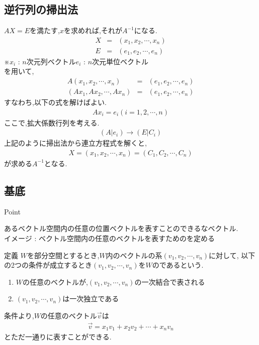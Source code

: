 \documentclass[a4paper]{jsarticle}
\begin{document}
\subsection{逆行列の掃出法}
$AX=E$\quad を満たす,$x$を求めれば,それが$A^{-1}$になる.
\begin{eqnarray*}
    X&=&\left(x_1,x_2,\cdots,x_n\right)\\
    E&=&\left(e_1,e_2,\cdots,e_n\right)
\end{eqnarray*}
※$x_i$ : $n$次元列ベクトル\quad $e_i$ : $n$次元単位ベクトル\\
を用いて,
\begin{eqnarray*}
    A\left(x_1,x_2,\cdots,x_n\right)&=&\left(e_1,e_2,\cdots,e_n\right)\\
    \left(Ax_1,Ax_2,\cdots,Ax_n\right)&=&\left(e_1,e_2,\cdots,e_n\right)
\end{eqnarray*}
すなわち,以下の式を解けばよい.
\begin{eqnarray*}
    Ax_i=e_i \left(i=1,2,\cdots,n\right)
\end{eqnarray*}
ここで,拡大係数行列を考える.
\begin{eqnarray*}
    \left(A|e_i\right) \rightarrow \left(E|C_i\right)
\end{eqnarray*}
上記のように掃出法から連立方程式を解くと,
\begin{eqnarray*}
    X=\left(x_1,x_2,\cdots,x_n\right)=\left(C_1,C_2,\cdots,C_n\right)
\end{eqnarray*}
が求める$A^{-1}$となる.
\subsection{基底}
\begin{itembox}[l]{Point}
    \begin{center}
        あるベクトル空間内の任意の位置ベクトルを表すことのできるなベクトル.\\
        イメージ : ベクトル空間内の任意のベクトルを表すためのを定める
    \end{center}
\end{itembox}
\begin{itembox}[l]{定義}
    $W$を部分空間とするとき,$W$内のベクトルの系$\left(v_1,v_2,\cdots,v_n\right)$に対して,
    以下の2つの条件が成立するとき$\left(v_1,v_2,\cdots,v_n\right)$を$W$のであるという.
    \begin{enumerate}[(1)]
        \item $W$の任意のベクトルが,$\left(v_1,v_2,\cdots,v_n\right)$の一次結合で表される
        \item $\left(v_1,v_2,\cdots,v_n\right)$は一次独立である
    \end{enumerate}
\end{itembox}
条件より,$W$の任意のベクトル$\vec{v}$は
\begin{eqnarray*}
    \vec{v}=x_1v_1+x_2v_2+\cdots+x_nv_n
\end{eqnarray*}
とただ一通りに表すことができる.
\end{document}
